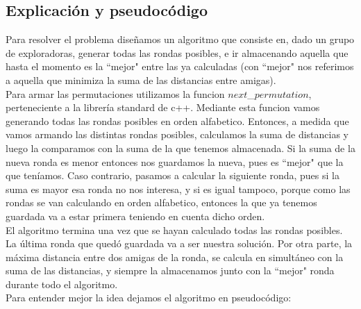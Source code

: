 \subsection{Explicación y pseudocódigo}
Para resolver el problema diseñamos un algoritmo que consiste en, dado un grupo de exploradoras, generar todas las rondas 
posibles, e ir almacenando aquella que hasta el momento es la ``mejor"$ $ entre las ya calculadas (con ``mejor"$ $ nos referimos a aquella que minimiza la suma de las distancias entre amigas).\\

Para armar las permutaciones utilizamos la funcion $next$\_$permutation$, perteneciente a la librería standard de c++. Mediante 
esta funcion vamos generando todas las rondas posibles en orden alfabetico. Entonces, a medida que vamos armando las 
distintas rondas posibles, calculamos la suma de distancias y luego la comparamos con la suma de la que tenemos almacenada. Si 
la suma de la nueva ronda es menor entonces nos guardamos la nueva, pues es ``mejor"$ $ que la que teníamos. Caso contrario, 
pasamos a calcular la siguiente ronda, pues si la suma es mayor esa ronda no nos interesa, y si es igual tampoco, porque como
las rondas se van calculando en orden alfabetico, entonces la que ya tenemos guardada va a estar primera teniendo en cuenta
dicho orden. \\

El algoritmo termina una vez que se hayan calculado todas las rondas posibles. La última ronda que quedó guardada va a ser nuestra solución. Por otra parte, la máxima distancia entre dos amigas de la ronda, se calcula en simultáneo con la suma de las distancias, y siempre la almacenamos junto con la ``mejor"$ $ ronda durante todo el algoritmo. \\

Para entender mejor la idea dejamos el algoritmo en pseudocódigo:\\   

